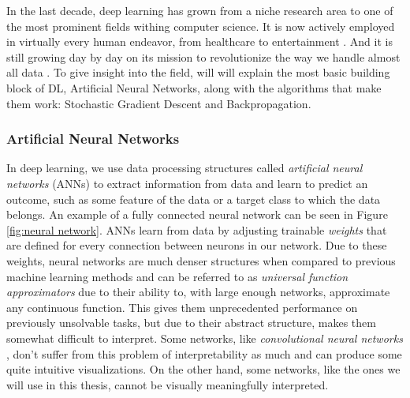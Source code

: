 \documentclass[times, utf8, diplomski, english]{fer_eng}
\begin{document}
In the last decade, deep learning has grown from a niche research area to one of the most prominent fields withing computer science. It is now actively employed in virtually every human endeavor, from healthcare to entertainment \cite{dl_applications}. And it is still growing day by day on its mission to revolutionize the way we handle almost all data \cite{dl_growth}. To give insight into the field, will will explain the most basic building block of DL, Artificial Neural Networks, along with the algorithms that make them work: Stochastic Gradient Descent and Backpropagation.

\subsubsection{Artificial Neural Networks}

In deep learning, we use data processing structures called \textit{artificial neural networks} (ANNs) to extract information from data and learn to predict an outcome, such as some feature of the data or a target class to which the data belongs. An example of a fully connected neural network can be seen in Figure \ref{fig:neural network}. ANNs learn from data by adjusting trainable \textit{weights} that are defined for every connection between neurons in our network. Due to these weights, neural networks are much denser structures when compared to previous machine learning methods and can be referred to as \textit{universal function approximators} \cite{uni_approx} due to their ability to, with large enough networks, approximate any continuous function. This gives them unprecedented performance on previously unsolvable tasks, but due to their abstract structure, makes them somewhat difficult to interpret. Some networks, like \textit{convolutional neural networks} \cite{CNN}, don't suffer from this problem of interpretability as much and can produce some quite intuitive visualizations. On the other hand, some networks, like the ones we will use in this thesis, cannot be visually meaningfully interpreted.
\end{document}
